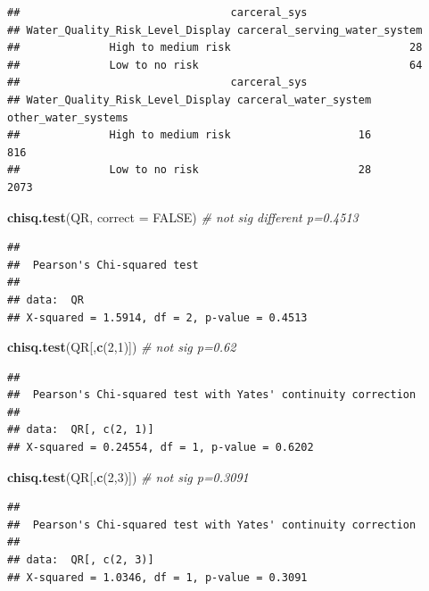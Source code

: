 \documentclass[
]{article}
\newenvironment{Shaded}{\begin{snugshade}}{\end{snugshade}}
\newcommand{\AttributeTok}[1]{\textcolor[rgb]{0.13,0.29,0.53}{#1}}
\newcommand{\CommentTok}[1]{\textcolor[rgb]{0.56,0.35,0.01}{\textit{#1}}}
\newcommand{\ConstantTok}[1]{\textcolor[rgb]{0.56,0.35,0.01}{#1}}
\newcommand{\DecValTok}[1]{\textcolor[rgb]{0.00,0.00,0.81}{#1}}
\newcommand{\FunctionTok}[1]{\textcolor[rgb]{0.13,0.29,0.53}{\textbf{#1}}}
\newcommand{\NormalTok}[1]{#1}
\begin{document}
\begin{verbatim}
##                                 carceral_sys
## Water_Quality_Risk_Level_Display carceral_serving_water_system
##              High to medium risk                            28
##              Low to no risk                                 64
##                                 carceral_sys
## Water_Quality_Risk_Level_Display carceral_water_system other_water_systems
##              High to medium risk                    16                 816
##              Low to no risk                         28                2073
\end{verbatim}

\begin{Shaded}
\begin{Highlighting}[]
\FunctionTok{chisq.test}\NormalTok{(QR, }\AttributeTok{correct =} \ConstantTok{FALSE}\NormalTok{) }\CommentTok{\# not sig different p=0.4513}
\end{Highlighting}
\end{Shaded}

\begin{verbatim}
## 
##  Pearson's Chi-squared test
## 
## data:  QR
## X-squared = 1.5914, df = 2, p-value = 0.4513
\end{verbatim}

\begin{Shaded}
\begin{Highlighting}[]
\FunctionTok{chisq.test}\NormalTok{(QR[,}\FunctionTok{c}\NormalTok{(}\DecValTok{2}\NormalTok{,}\DecValTok{1}\NormalTok{)]) }\CommentTok{\# not sig p=0.62}
\end{Highlighting}
\end{Shaded}

\begin{verbatim}
## 
##  Pearson's Chi-squared test with Yates' continuity correction
## 
## data:  QR[, c(2, 1)]
## X-squared = 0.24554, df = 1, p-value = 0.6202
\end{verbatim}

\begin{Shaded}
\begin{Highlighting}[]
\FunctionTok{chisq.test}\NormalTok{(QR[,}\FunctionTok{c}\NormalTok{(}\DecValTok{2}\NormalTok{,}\DecValTok{3}\NormalTok{)]) }\CommentTok{\# not sig p=0.3091}
\end{Highlighting}
\end{Shaded}

\begin{verbatim}
## 
##  Pearson's Chi-squared test with Yates' continuity correction
## 
## data:  QR[, c(2, 3)]
## X-squared = 1.0346, df = 1, p-value = 0.3091
\end{verbatim}
\end{document}
